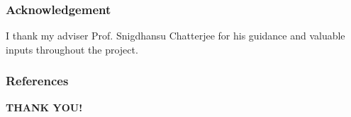 \documentclass[handout,10pt]{beamer}
\begin{document}
\begin{frame}
\frametitle{Acknowledgement}
I thank my adviser Prof. Snigdhansu Chatterjee for his guidance and valuable inputs throughout the project.
\end{frame}

\begin{frame}
\frametitle{References}


\end{frame}

\begin{frame}
\centering\huge
\textcolor{UniBlue}{\textbf{THANK YOU!}}
\end{frame}
\end{document}

